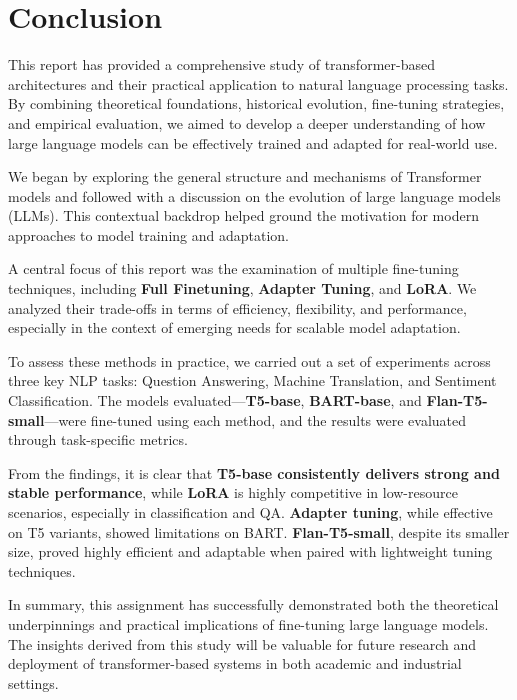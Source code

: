 \chapter{Conclusion}

This report has provided a comprehensive study of transformer-based architectures and their practical application to natural language processing tasks. By combining theoretical foundations, historical evolution, fine-tuning strategies, and empirical evaluation, we aimed to develop a deeper understanding of how large language models can be effectively trained and adapted for real-world use.

We began by exploring the general structure and mechanisms of Transformer models and followed with a discussion on the evolution of large language models (LLMs). This contextual backdrop helped ground the motivation for modern approaches to model training and adaptation.

A central focus of this report was the examination of multiple fine-tuning techniques, including \textbf{Full Finetuning}, \textbf{Adapter Tuning}, and \textbf{LoRA}. We analyzed their trade-offs in terms of efficiency, flexibility, and performance, especially in the context of emerging needs for scalable model adaptation.

To assess these methods in practice, we carried out a set of experiments across three key NLP tasks: Question Answering, Machine Translation, and Sentiment Classification. The models evaluated—\textbf{T5-base}, \textbf{BART-base}, and \textbf{Flan-T5-small}—were fine-tuned using each method, and the results were evaluated through task-specific metrics.

From the findings, it is clear that \textbf{T5-base consistently delivers strong and stable performance}, while \textbf{LoRA} is highly competitive in low-resource scenarios, especially in classification and QA. \textbf{Adapter tuning}, while effective on T5 variants, showed limitations on BART. \textbf{Flan-T5-small}, despite its smaller size, proved highly efficient and adaptable when paired with lightweight tuning techniques.

In summary, this assignment has successfully demonstrated both the theoretical underpinnings and practical implications of fine-tuning large language models. The insights derived from this study will be valuable for future research and deployment of transformer-based systems in both academic and industrial settings.

\newpage
